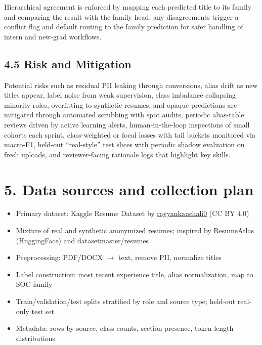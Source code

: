 \documentclass[12pt]{article}
\begin{document}
\medskip

Hierarchical agreement is enforced by mapping each predicted title to its family and comparing the result with the family head; any disagreements trigger a conflict flag and default routing to the family prediction for safer handling of intern and new-grad workflows.

\medskip

\subsection*{4.5 Risk and Mitigation}
Potential risks such as residual PII leaking through conversions, alias drift as new titles appear, label noise from weak supervision, class imbalance collapsing minority roles, overfitting to synthetic resumes, and opaque predictions are mitigated through automated scrubbing with spot audits, periodic alias-table reviews driven by active learning alerts, human-in-the-loop inspections of small cohorts each sprint, class-weighted or focal losses with tail buckets monitored via macro-F1, held-out ``real-style'' test slices with periodic shadow evaluation on fresh uploads, and reviewer-facing rationale logs that highlight key skills.

\setlength{\parindent}{15pt}

\section*{5. Data sources and collection plan}
\begin{itemize}
  \item Primary dataset: Kaggle Resume Dataset by \href{https://www.kaggle.com/datasets/rayyankauchali0/resume-dataset?resource=download}{rayyankauchali0} (CC BY 4.0)
  \item Mixture of real and synthetic anonymized resumes; inspired by ResumeAtlas (HuggingFace) and datasetmaster/resumes
  \item Preprocessing: PDF/DOCX $\rightarrow$ text, remove PII, normalize titles
  \item Label construction: most recent experience title, alias normalization, map to SOC family
  \item Train/validation/test splits stratified by role and source type; held-out real-only test set
  \item Metadata: rows by source, class counts, section presence, token length distributions
\end{itemize}
\end{document}
